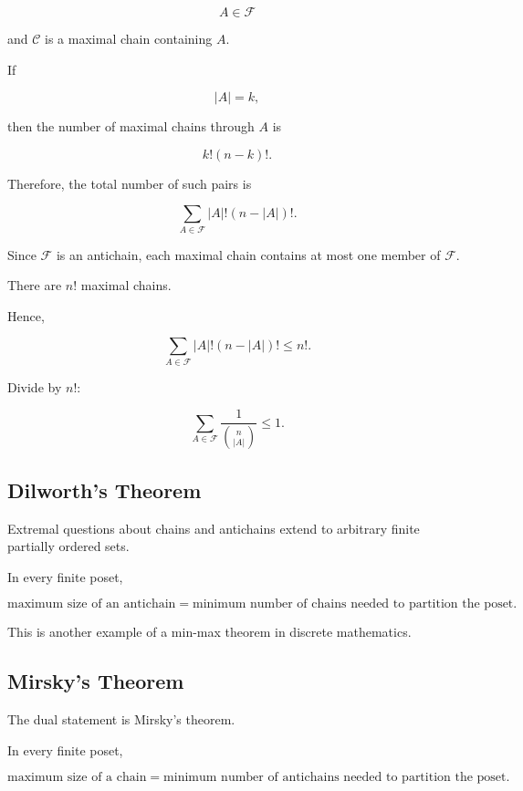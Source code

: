 \[
A\in\mathcal{F}
\]

and \(\mathcal{C}\) is a maximal chain containing \(A\).

If

\[
|A|=k,
\]

then the number of maximal chains through \(A\) is

\[
k!(n-k)!.
\]

Therefore, the total number of such pairs is

\[
\sum_{A\in\mathcal{F}}
|A|!(n-|A|)!.
\]

Since \(\mathcal{F}\) is an antichain, each maximal chain contains at
most one member of \(\mathcal{F}\).

There are \(n!\) maximal chains.

Hence,

\[
\sum_{A\in\mathcal{F}}
|A|!(n-|A|)!
\leq
n!.
\]

Divide by \(n!\):

\[
\boxed{
\sum_{A\in\mathcal{F}}
\frac{1}{\binom{n}{|A|}}
\leq1.
}
\]

\subsection{Dilworth's Theorem}
\label{subsec:dilworth-extremal}

Extremal questions about chains and antichains extend to arbitrary
finite partially ordered sets.

\begin{theorem}
In every finite poset,

\[
\boxed{
\text{maximum size of an antichain}
=
\text{minimum number of chains needed to partition the poset}.
}
\]
\end{theorem}

This is another example of a min-max theorem in discrete mathematics.

\subsection{Mirsky's Theorem}
\label{subsec:mirsky-extremal}

The dual statement is Mirsky's theorem.

\begin{theorem}
In every finite poset,

\[
\boxed{
\text{maximum size of a chain}
=
\text{minimum number of antichains needed to partition the poset}.
}
\]
\end{theorem}

